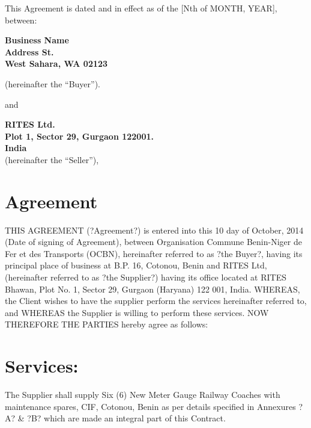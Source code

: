\documentclass{standalone}
\begin{document}
 
\renewcommand*\thesection{\arabic{section}}

\begin{center}

This Agreement is dated and in effect as of the [Nth of MONTH, YEAR], between:\\
\vskip 1cm

{\bf Business Name\\ Address  St.\\ West Sahara, WA 02123\\}

(hereinafter the ``Buyer'').  

and\\

\vskip 1cm

{\bf  RITES Ltd.\\  Plot 1, Sector 29, Gurgaon 122001.\\ India\\}
\vskip 1cm
(hereinafter the ``Seller''), 

\vskip 2cm

\end{center}


\section{Agreement}

THIS AGREEMENT (?Agreement?) is entered into this 10 day of October, 2014 (Date of signing of Agreement), between Organisation Commune Benin-Niger de Fer et des Transports (OCBN), hereinafter referred to as ?the Buyer?, having its principal place of business at B.P. 16, Cotonou, Benin and RITES Ltd, (hereinafter referred to as ?the Supplier?) having its office located at RITES Bhawan, Plot No. 1, Sector 29, Gurgaon (Haryana) 122 001, India.
\newline
WHEREAS, the Client wishes to have the supplier perform the services hereinafter referred to, and 
\newline
WHEREAS the Supplier is willing to perform these services.
\newline
NOW THEREFORE THE PARTIES hereby agree as follows:


\section{Services:}

The Supplier shall supply Six (6)  New Meter Gauge Railway Coaches with maintenance spares, CIF, Cotonou, Benin  as per details  specified in Annexures ?A? \& ?B? which are made an integral part of this Contract. 
\end{document}
